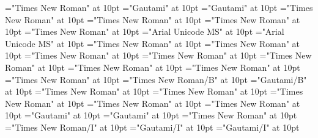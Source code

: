 \documentclass[a4paper]{article}
\begin{document}
 
\pagestyle{plain} 
\font\spanenentryletDatadicBody="Times New Roman" at 10pt
\font\spantexitemtespanentranslationsexamplessensesensesentryletDatadicBody="Gautami" at 10pt
\font\xitemtespanentranslationsexamplessensesensesentryletDatadicBody="Gautami" at 10pt
\font\spanenspanenspanentranslationsexamplessensesensesentryletDatadicBody="Times New Roman" at 10pt
\font\spanenspanentranslationsexamplessensesensesentryletDatadicBody="Times New Roman" at 10pt
\font\spanentranslationsexamplessensesensesentryletDatadicBody="Times New Roman" at 10pt
\font\spanenLexSensepublishStemGlossPubLesensesensesentryletDatadicBody="Times New Roman" at 10pt
\font\spanhiLexSensepublishStemGlossPubLesensesensesentryletDatadicBody="Arial Unicode MS" at 10pt
\font\LexSensepublishStemGlossPubLesensesensesentryletDatadicBody="Arial Unicode MS" at 10pt
\font\spanenspanenpictureCaptionpictureRightentryletDatadicBody="Times New Roman" at 10pt
\font\spanenpictureCaptionpictureRightentryletDatadicBody="Times New Roman" at 10pt
\font\spanenCmPicturepublishStemPileThumbnailPubpictureCaptionpictureRightentryletDatadicBody="Times New Roman" at 10pt
\font\CmPicturepublishStemPileThumbnailPubpictureCaptionpictureRightentryletDatadicBody="Times New Roman" at 10pt
\font\pictureCaptionpictureRightentryletDatadicBody="Times New Roman" at 10pt
\font\picturepictureRightentryletDatadicBody="Times New Roman" at 10pt
\font\pictureRightentryletDatadicBody="Times New Roman" at 10pt
\font\spanencomplexformrefsentryletDatadicBody="Times New Roman" at 10pt
\font\spanencomplexformformcomplexformrefsentryletDatadicBody="Times New Roman/B" at 10pt
\font\complexformformcomplexformrefsentryletDatadicBody="Gautami/B" at 10pt
\font\spanenspanencomplexformtypecomplexformrefsentryletDatadicBody="Times New Roman" at 10pt
\font\spanencomplexformtypecomplexformrefsentryletDatadicBody="Times New Roman" at 10pt
\font\complexformtypecomplexformrefsentryletDatadicBody="Times New Roman" at 10pt
\font\complexformrefsentryletDatadicBody="Times New Roman" at 10pt
\font\spanentranslationLdtranslationsexamplessensesensesentryletDatadicBody="Times New Roman" at 10pt
\font\spantetranslationLdtranslationsexamplessensesensesentryletDatadicBody="Gautami" at 10pt
\font\translationLdtranslationsexamplessensesensesentryletDatadicBody="Gautami" at 10pt
\font\translationsexamplessensesensesentryletDatadicBody="Times New Roman" at 10pt
\font\spanenexampleexamplessensesensesentryletDatadicBody="Times New Roman/I" at 10pt
\font\spanggoTeluINexampleexamplessensesensesentryletDatadicBody="Gautami/I" at 10pt
\font\exampleexamplessensesensesentryletDatadicBody="Gautami/I" at 10pt
\end{document}
